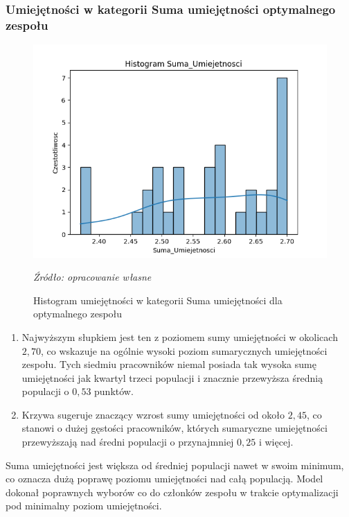         \subsubsection{Umiejętności w kategorii Suma umiejętności optymalnego zespołu}
        \begin{figure}[H]
            \centering
            \includegraphics[width=\linewidth]{chapters/Images/hist_suma_optimal.png}
            \cprotect\caption{Histogram umiejętności w kategorii Suma umiejętności dla optymalnego zespołu}
            \textit{Źródło: opracowanie własne} 
            \label{fig:hist_suma_optimal}
        \end{figure}

        \begin{enumerate}
            \item Najwyższym słupkiem jest ten z poziomem sumy umiejętności w okolicach $2,70$, co wskazuje na ogólnie wysoki poziom sumarycznych umiejętności zespołu. Tych siedmiu pracowników niemal posiada tak wysoka sumę umiejętności jak kwartyl trzeci populacji i znacznie przewyższa średnią populacji o $0,53$ punktów.
            \item Krzywa sugeruje znaczący wzrost sumy umiejętności od około $2,45$, co stanowi o dużej gęstości pracowników, których sumaryczne umiejętności przewyższają nad średni populacji o przynajmniej $0,25$ i więcej.
        \end{enumerate}

        \par Suma umiejętności jest większa od średniej populacji nawet w swoim minimum, co oznacza dużą poprawę poziomu umiejętności nad całą populacją. Model dokonał poprawnych wyborów co do członków zespołu w trakcie optymalizacji pod minimalny poziom umiejętności.

